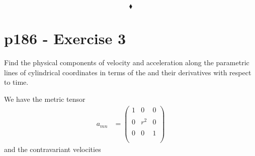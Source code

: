 $$\blacklozenge$$
\newpage




\section{p186 - Exercise 3}
\begin{tcolorbox}
Find the physical components of velocity and acceleration along the parametric lines of cylindrical coordinates in terms of the  and their derivatives with respect to time.
\end{tcolorbox}
We have the metric tensor 
\begin{align}
a_{mn} &= \begin{pmatrix}
1&0&0\\\\
0&r^2&0\\\\
0&0&1\\\\
\end{pmatrix}
\end{align}
and the contravariant velocities

